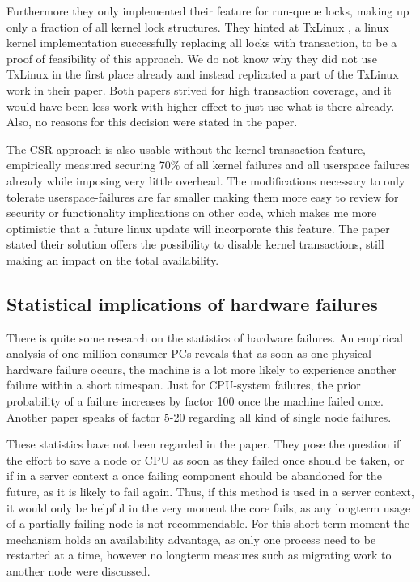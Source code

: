 \documentclass[a4paper,10pt,twoside]{article}
\begin{document}
Furthermore they only implemented their feature for run-queue locks, making up only a fraction of all kernel lock structures. They hinted at TxLinux \cite{TxLinux}, a linux kernel implementation successfully replacing all locks with transaction, to be a proof of feasibility of this approach. We do not know why they did not use TxLinux in the first place already and instead replicated a part of the TxLinux work in their paper. Both papers strived for high transaction coverage, and it would have been less work with higher effect to just use what is there already. Also, no reasons for this decision were stated in the paper.

The CSR approach is also usable without the kernel transaction feature, empirically measured securing 70\% of all kernel failures and all userspace failures already while imposing very little overhead. The modifications necessary to only tolerate userspace-failures are far smaller making them more easy to review for security or functionality implications on other code, which makes me more optimistic that a future linux update will incorporate this feature. The paper stated their solution offers the possibility to disable kernel transactions, still making an impact on the total availability.

\subsection{Statistical implications of hardware failures}
There is quite some research on the statistics of hardware failures. An empirical analysis of one million consumer PCs \cite{Microsoftfailures} reveals that as soon as one physical hardware failure occurs, the machine is a lot more likely to experience another failure within a short timespan. Just for CPU-system failures, the prior probability of a failure increases by factor 100 once the machine failed once. Another paper \cite{HPCfailures} speaks of factor 5-20 regarding all kind of single node failures. 

These statistics have not been regarded in the paper. They pose the question if the effort to save a node or CPU as soon as they failed once should be taken, or if in a server context a once failing component should be abandoned for the future, as it is likely to fail again. Thus, if this method is used in a server context, it would only be helpful in the very moment the core fails, as any longterm usage of a partially failing node is not recommendable. For this short-term moment the mechanism holds an availability advantage, as only one process need to be restarted at a time, however no longterm measures such as migrating work to another node \cite{VMLiveMigration} were discussed. 
\end{document}
